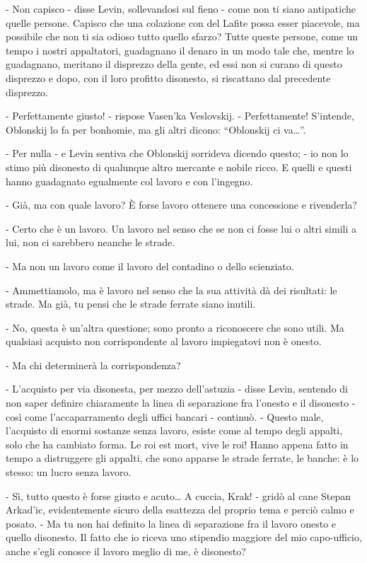 - Non capisco - disse Levin, sollevandosi sul fieno - come non ti siano antipatiche quelle persone. Capisco che una colazione con del Lafite possa esser piacevole, ma possibile che non ti sia odioso tutto quello sfarzo? Tutte queste persone, come un tempo i nostri appaltatori, guadagnano il denaro in un modo tale che, mentre lo guadagnano, meritano il disprezzo della gente, ed essi non si curano di questo disprezzo e dopo, con il loro profitto disonesto, si riscattano dal precedente disprezzo. 

- Perfettamente giusto! - rispose Vasen'ka Veslovskij. - Perfettamente! S'intende, Oblonskij lo fa per bonhomie, ma gli altri dicono: ``Oblonskij ci va\ldots{}''. 

- Per nulla - e Levin sentiva che Oblonskij sorrideva dicendo questo; - io non lo stimo più disonesto di qualunque altro mercante e nobile ricco. E quelli e questi hanno guadagnato egualmente col lavoro e con l'ingegno. 

- Già, ma con quale lavoro? È forse lavoro ottenere una concessione e rivenderla? 

- Certo che è un lavoro. Un lavoro nel senso che se non ci fosse lui o altri simili a lui, non ci sarebbero neanche le strade. 

- Ma non un lavoro come il lavoro del contadino o dello scienziato. 

- Ammettiamolo, ma è lavoro nel senso che la sua attività dà dei risultati: le strade. Ma già, tu pensi che le strade ferrate siano inutili. 

- No, questa è un'altra questione; sono pronto a riconoscere che sono utili. Ma qualsiasi acquisto non corrispondente al lavoro impiegatovi non è onesto. 

- Ma chi determinerà la corrispondenza? 

- L'acquisto per via disonesta, per mezzo dell'astuzia - disse Levin, sentendo di non saper definire chiaramente la linea di separazione fra l'onesto e il disonesto - così come l'accaparramento degli uffici bancari - continuò. - Questo male, l'acquisto di enormi sostanze senza lavoro, esiste come al tempo degli appalti, solo che ha cambiato forma. Le roi est mort, vive le roi! Hanno appena fatto in tempo a distruggere gli appalti, che sono apparse le strade ferrate, le banche: è lo stesso: un lucro senza lavoro. 

- Sì, tutto questo è forse giusto e acuto\ldots{} A cuccia, Krak! - gridò al cane Stepan Arkad'ic, evidentemente sicuro della esattezza del proprio tema e perciò calmo e posato. - Ma tu non hai definito la linea di separazione fra il lavoro onesto e quello disonesto. Il fatto che io riceva uno stipendio maggiore del mio capo-ufficio, anche s'egli conosce il lavoro meglio di me, è disonesto? 

